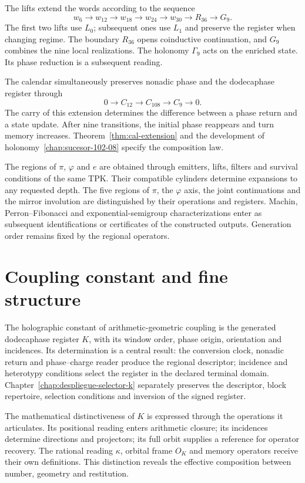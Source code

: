 The lifts extend the words according to the sequence
\[
 w_6\longrightarrow w_{12}\longrightarrow w_{18}
 \longrightarrow w_{24}\longrightarrow w_{30}
 \longrightarrow R_{36}\longrightarrow G_9.
\]
The first two lifts use \(L_0\); subsequent ones use \(L_1\) and preserve the register when changing regime. The boundary \(R_{36}\) opens coinductive continuation, and \(G_9\) combines the nine local realizations. The holonomy \(\Gamma_9\) acts on the enriched state. Its phase reduction is a subsequent reading.

The calendar simultaneously preserves nonadic phase and the dodecaphase register through
\[
 0\longrightarrow C_{12}\longrightarrow C_{108}
 \longrightarrow C_9\longrightarrow0.
\]
The carry of this extension determines the difference between a phase return and a state update. After nine transitions, the initial phase reappears and turn memory increases. Theorem~\ref{thm:cal-extension} and the development of holonomy~\ref{chap:sucesor-102-08} specify the composition law.

The regions of \(\pi\), \(\varphi\) and \(e\) are obtained through emitters, lifts, filters and survival conditions of the same TPK. Their compatible cylinders determine expansions to any requested depth. The five regions of \(\pi\), the \(\varphi\) axis, the joint continuations and the mirror involution are distinguished by their operations and registers. Machin, Perron--Fibonacci and exponential-semigroup characterizations enter as subsequent identifications or certificates of the constructed outputs. Generation order remains fixed by the regional operators.

\section*{Coupling constant and fine structure}

The holographic constant of arithmetic-geometric coupling is the generated dodecaphase register \(K\), with its window order, phase origin, orientation and incidences. Its determination is a central result: the conversion clock, nonadic return and phase--charge reader produce the regional descriptor; incidence and heterotypy conditions select the register in the declared terminal domain. Chapter~\ref{chap:despliegue-selector-k} separately preserves the descriptor, block repertoire, selection conditions and inversion of the signed register.

The mathematical distinctiveness of \(K\) is expressed through the operations it articulates. Its positional reading enters arithmetic closure; its incidences determine directions and projectors; its full orbit supplies a reference for operator recovery. The rational reading \(\kappa\), orbital frame \(O_K\) and memory operators receive their own definitions. This distinction reveals the effective composition between number, geometry and restitution.

